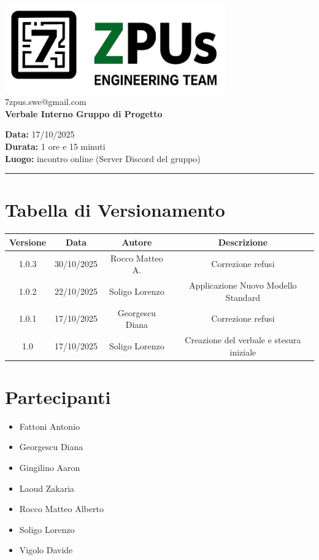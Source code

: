 \documentclass[a4paper,12pt]{article}
\begin{document}
\begin{center}
    \includegraphics[width=9.5cm]{../../../assets/logo7ZPUs.jpg}\\
    \small\hspace{10cm} 7zpus.swe@gmail.com\\
    \Large \textbf{Verbale Interno Gruppo di Progetto}\\
    \vspace{0.5cm}
\end{center}

\noindent
\textbf{Data:} 17/10/2025 \\
\textbf{Durata:} 1 ore e 15 minuti \\
\textbf{Luogo:} incontro online (Server Discord del gruppo)

\vspace{0.3cm}
\hrule
\vspace{0.5cm}

\tableofcontents

\newpage

\section*{Tabella di Versionamento}
\begin{tabular}{|c|c|c|c|}
    \hline
    \textbf{Versione} & \textbf{Data} & \textbf{Autore} & \textbf{Descrizione}                     \\
    \hline
    1.0.3 & 30/10/2025 & Rocco Matteo A. & Correzione refusi \\
    \hline
    1.0.2 & 22/10/2025 & Soligo Lorenzo  & Applicazione Nuovo Modello Standard \\
    \hline
    1.0.1 & 17/10/2025 & Georgescu Diana & Correzione refusi \\
    \hline
    1.0 & 17/10/2025 & Soligo Lorenzo  & Creazione del verbale e stesura iniziale \\
    \hline

\end{tabular}

\section*{Partecipanti}
\begin{itemize}[noitemsep]
    \item Fattoni Antonio
    \item Georgescu Diana
    \item Gingilino Aaron
    \item Laoud Zakaria
    \item Rocco Matteo Alberto
    \item Soligo Lorenzo
    \item Vigolo Davide
\end{itemize}
\end{document}
